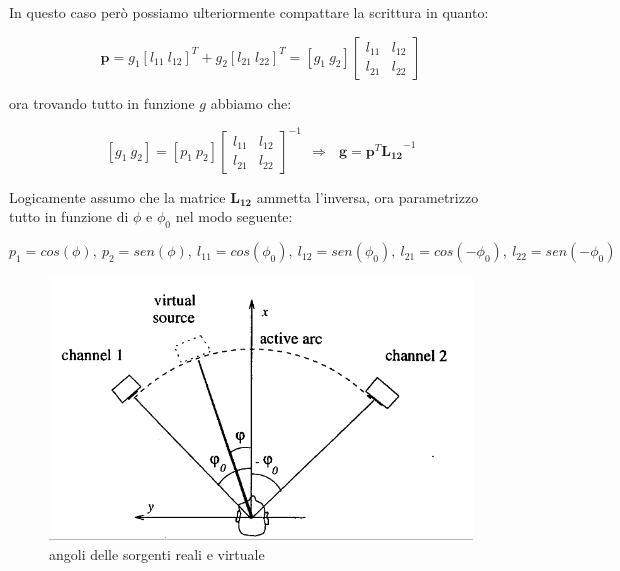 \documentclass[12pt,a4paper]{report}
\begin{document}
In questo caso però possiamo ulteriormente compattare la scrittura in quanto:

\begin{equation}
\boldsymbol{p}=g_1 {\left[ l_{11} \ l_{12} \right]}^T + g_2 {\left[ l_{21} \ l_{22} \right]}^T= \left[ g_1 \ g_2 \right] \left[\begin{matrix}
l_{11} & l_{12}\\ l_{21} & l_{22}
\end{matrix} \right]
\label{eq:cccc}
\end{equation}

ora trovando tutto in funzione $g$ abbiamo che:

\begin{equation}
\left[g_1 \ g_2\right] = \left[ p_1 \ p_2 \right]  {\left[\begin{matrix} 
l_{11} & l_{12}\\ l_{21} & l_{22}
\end{matrix} \right]}^{-1} \ \ \Rightarrow \ \ \ \boldsymbol{g}=\boldsymbol{p}^T {\boldsymbol{L_{12}}}^{-1}
\label{eq:dddd}
\end{equation}

Logicamente assumo che la matrice $\boldsymbol{L_{12}}$ ammetta l'inversa, ora parametrizzo tutto in funzione di $\phi$ e $\phi_0$ nel modo seguente: 

\[ p_1=cos(\phi),\ p_2=sen(\phi),\ l_{11}=cos(\phi_0),\ l_{12}=sen(\phi_0),\ l_{21}=cos(-\phi_0),\ l_{22}=sen(-\phi_0) \]

\begin{figure}[htbp]
	\centering
	\includegraphics[scale=0.40]{figures/angoli.png}
	\caption {angoli delle sorgenti reali e virtuale} 
	\label{fig:angoli}
	\end{figure}
\end{document}
